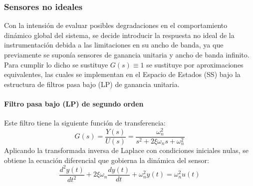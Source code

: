 \documentclass[blue,fullpaper]{ludusofficial}  %
\begin{document}
\subsubsection{Sensores no ideales}
Con la intensión de evaluar posibles degradaciones en el comportamiento dinámico global del sistema, se decide introducir la respuesta no ideal de la instrumentación debida a las limitaciones en su ancho de banda, ya que previamente se suponía sensores de ganancia unitaria y ancho de banda infinito. Para cumplir lo dicho se sustituye $G(s)\equiv1$ se sustituye por aproximaciones equivalentes, las cuales se implementan en el Espacio de Estados (SS) bajo la estructura de filtros pasa bajo (LP) de ganancia unitaria.
\paragraph{Filtro pasa bajo (LP) de segundo orden}
Este filtro tiene la siguiente función de transferencia:
\begin{equation}
    G(s) = \frac{Y(s)}{U(s)} = \frac{\omega_n^2}{s^2 + 2\xi\omega_n s + \omega_n^2}
\end{equation}
Aplicando la transformada inversa de Laplace con condiciones iniciales nulas, se obtiene la ecuación diferencial que gobierna la dinámica del sensor:
\begin{equation}
    \frac{d^2y(t)}{dt^2} + 2\xi\omega_n \frac{dy(t)}{dt} + \omega_n^2 y(t) = \omega_n^2 u(t)
\end{equation}
\end{document}
